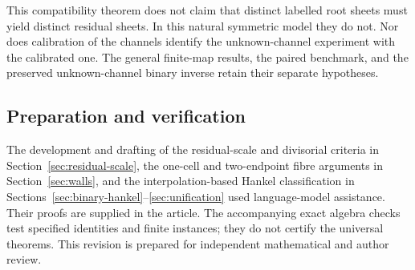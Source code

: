 This compatibility theorem does not claim that distinct labelled root
sheets must yield distinct residual sheets. In this natural symmetric
model they do not. Nor does calibration of the channels identify the
unknown-channel experiment with the calibrated one. The general
finite-map results, the paired benchmark, and the preserved
unknown-channel binary inverse retain their separate hypotheses.

\subsection*{Preparation and verification}
The development and drafting of the residual-scale and divisorial
criteria in Section~\ref{sec:residual-scale}, the one-cell and two-endpoint
fibre arguments in Section~\ref{sec:walls}, and the interpolation-based
Hankel classification in Sections~\ref{sec:binary-hankel}--\ref{sec:unification}
used language-model assistance. Their proofs are supplied in the article.
The accompanying exact algebra checks test specified identities and finite
instances; they do not certify the universal theorems. This revision is
prepared for independent mathematical and author review.
